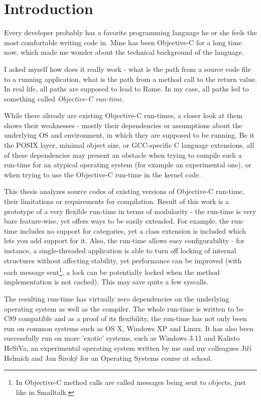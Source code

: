 \chapter*{Introduction}

Every developer probably has a favorite programming language he or she feels the most comfortable writing code in. Mine has been Objective-C for a long time now, which made me wonder about the technical background of the language.

I asked myself how does it really work - what is the path from a source code file to a running application, what is the path from a method call to the return value. In real life, all paths are supposed to lead to Rome. In my case, all paths led to something called \emph{Objective-C run-time}.

While there already are existing Objective-C run-times, a closer look at them shows their weaknesses - mostly their dependencies or assumptions about the underlying OS and environment, in which they are supposed to be running. Be it the POSIX layer, minimal object size, or GCC-specific C language extensions, all of these dependencies may present an obstacle when trying to compile such a run-time for an atypical operating system (for example an experimental one), or when trying to use the Objective-C run-time in the kernel code.

This thesis analyzes source codes of existing versions of Objective-C run-time, their limitations or requirements for compilation. Result of this work is a prototype of a very flexible run-time in terms of modularity - the run-time is very bare feature-wise, yet offers ways to be easily extended. For example, the run-time includes no support for categories, yet a class extension is included which lets you add support for it. Also, the run-time allows easy configurability - for instance, a single-threaded application is able to turn off locking of internal structures without affecting stability, yet performance can be improved (with each message sent\footnote{In Objective-C method calls are called messages being sent to objects, just like in Smalltalk.}, a lock can be potentially locked when the method implementation is not cached). This may save quite a few syscalls.

The resulting run-time has virtually zero dependencies on the underlying operating system as well as the compiler. The whole run-time is written to be C89 compatible and as a proof of its flexibility, the run-time has not only been run on common systems such as OS X, Windows XP and Linux. It has also been successfully run on more 'exotic' systems, such as Windows 3.11 and Kalisto HeSiVa, an experimental operating system written by me and my colleagues Jiří Helmich and Jan Široký for an Operating Systems course at school.
